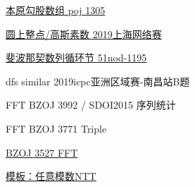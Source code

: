 


\vbox{}

\vbox{}

\begin{problemset}
	\item \href{http://poj.org/problem?id=1305}{本原勾股数组 \quad poj 1305}
	\item \href{https://nanti.jisuanke.com/t/41421}{圆上整点/高斯素数 \quad 2019上海网络赛}
	\item \href{https://www.51nod.com/Challenge/Problem.html#problemId=1195}{斐波那契数列循环节 \quad 51nod-1195}
	\item dfs similar \quad 2019icpc亚洲区域赛-南昌站B题
	\item FFT \quad BZOJ 3992 / SDOI2015 序列统计
	\item FFT \quad BZOJ 3771 Triple
	\item \href{https://www.lydsy.com/JudgeOnline/problem.php?id=3527}{BZOJ 3527 \quad FFT}
	\item \href{https://www.luogu.com.cn/problem/P4245}{模板：任意模数NTT}
\end{problemset}


\nocite{*} 


